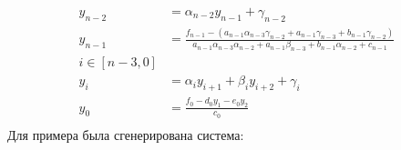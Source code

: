 \documentclass[a4paper, fontsize=14pt]{article}
\begin{document}
\begin{equation*}
    \begin{aligned}
        y_{n-2} & =\alpha_{n-2}y_{n-1}+\gamma_{n-2}                                                                                                                                         \\
        y_{n-1} & =\frac{f_{n-1}-(a_{n-1}\alpha_{n-3}\gamma_{n-2}+a_{n-1}\gamma_{n-3}+b_{n-1}\gamma_{n-2})}{a_{n-1}\alpha_{n-3}\alpha_{n-2}+a_{n-1}\beta_{n-3}+b_{n-1}\alpha_{n-2}+c_{n-1}} \\
        i\in[n-3,0]                                                                                                                                                                         \\
        y_i     & =\alpha_iy_{i+1}+\beta_iy_{i+2}+\gamma_i                                                                                                                                  \\
        y_0     & =\frac{f_0-d_0y_1-e_0y_2}{c_0}                                                                                                                                            \\
    \end{aligned}
\end{equation*}
\newpage
Для примера была сгенерирована система:
\end{document}
